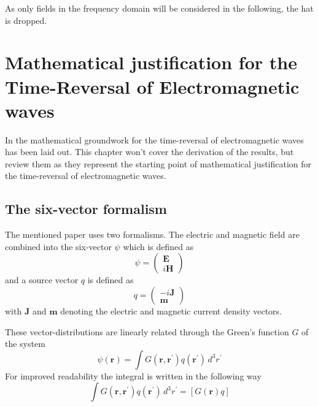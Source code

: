 As only fields in the frequency domain will be considered in the following, the hat is dropped.



\section{Mathematical justification for the Time-Reversal of Electromagnetic waves}\label{sec:math_foundations_em_tr}
In \parencite{de_rosny_theory_2010} the mathematical groundwork for the time-reversal of electromagnetic waves has been laid out.
This chapter won't cover the derivation of the results, but review them as they represent the starting point of mathematical justification for the time-reversal of electromagnetic waves.

\subsection{The six-vector formalism}
The mentioned paper uses two formalisms.
The electric and magnetic field are combined into the  six-vector \(\psi \) which is defined as
\begin{equation}
    \psi = \begin{pmatrix}
        \mathbf{E} \\
        i\mathbf{H}
    \end{pmatrix}
\end{equation}
and a source vector \(q\) is defined as
\begin{equation}
    q = \begin{pmatrix}
        -i\mathbf{J} \\
        \mathbf{m}
    \end{pmatrix}
\end{equation}
with \(\mathbf{J}\) and \(\mathbf{m}\) denoting the electric and magnetic current density vectors.

These vector-distributions are linearly related through the Green's function \(G\) of the system
\begin{equation}
    \psi(\mathbf{r}) = \int G(\mathbf{r}, \mathbf{r}^{\prime}) q(\mathbf{r}^{\prime}) \, d^3 r^{\prime}
\end{equation}
For improved readability the integral is written in the following way
\begin{equation}
    \int G(\mathbf{r}, \mathbf{r}^{\prime}) q(\mathbf{r}^{\prime}) \, d^3 r^{\prime} = [G(\mathbf{r}) q]
\end{equation}

